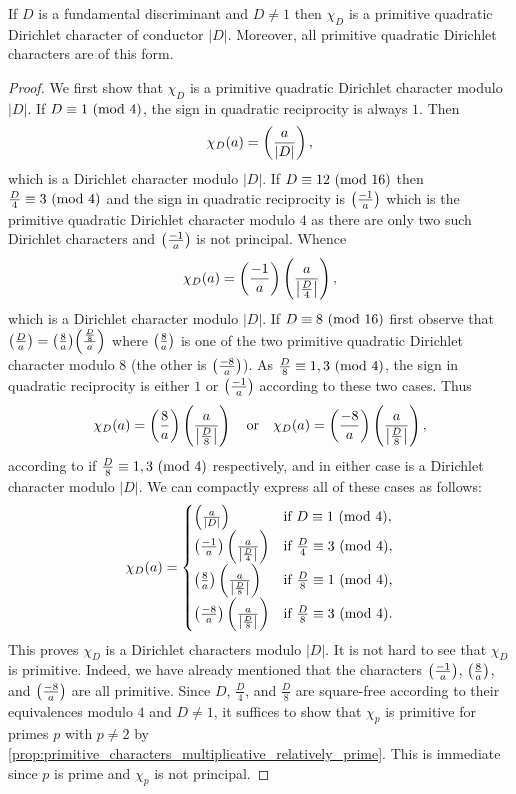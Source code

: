     \begin{theorem}\label{thm:fundamental_discriminant_character_primitive}
      If \(D\) is a fundamental discriminant and \(D \neq 1\) then \(\chi_{D}\) is a primitive quadratic Dirichlet character of conductor \(|D|\). Moreover, all primitive quadratic Dirichlet characters are of this form.
    \end{theorem}
    \begin{proof}
      We first show that \(\chi_{D}\) is a primitive quadratic Dirichlet character modulo \(|D|\). If \(D \equiv 1 \ (\mathrm{mod}\text{ }4)\), the sign in quadratic reciprocity is always \(1\). Then
      \[
        \chi_{D}(a) = \left(\frac{a}{|D|}\right),
      \]
      which is a Dirichlet character modulo \(|D|\). If \(D \equiv 12 \ (\mathrm{mod}\text{ }16)\) then \(\frac{D}{4} \equiv 3 \ (\mathrm{mod}\text{ }4)\) and the sign in quadratic reciprocity is \(\textstyle{\left(\frac{-1}{a}\right)}\) which is the primitive quadratic Dirichlet character modulo \(4\) as there are only two such Dirichlet characters and \(\left(\frac{-1}{a}\right)\) is not principal. Whence
      \[
        \chi_{D}(a) = \left(\frac{-1}{a}\right)\left(\frac{a}{\left|\frac{D}{4}\right|}\right),
      \]
      which is a Dirichlet character modulo \(|D|\). If \(D \equiv 8 \ (\mathrm{mod}\text{ }16)\) first observe that \(\textstyle{\left(\frac{D}{a}\right)} = \textstyle{\left(\frac{8}{a}\right)}\textstyle{\left(\frac{\frac{D}{8}}{a}\right)}\) where \(\textstyle{\left(\frac{8}{a}\right)}\) is one of the two primitive quadratic Dirichlet character modulo \(8\) (the other is \(\textstyle{\left(\frac{-8}{a}\right)}\)). As \(\frac{D}{8} \equiv 1,3 \ (\mathrm{mod}\text{ }4)\), the sign in quadratic reciprocity is either \(1\) or \(\textstyle{\left(\frac{-1}{a}\right)}\) according to these two cases. Thus
      \[
        \chi_{D}(a) = \left(\frac{8}{a}\right)\left(\frac{a}{\left|\frac{D}{8}\right|}\right) \quad \text{or} \quad \chi_{D}(a) = \left(\frac{-8}{a}\right)\left(\frac{a}{\left|\frac{D}{8}\right|}\right),
      \]
      according to if \(\frac{D}{8} \equiv 1,3 \ (\mathrm{mod}\text{ }4)\) respectively, and in either case is a Dirichlet character modulo \(|D|\). We can compactly express all of these cases as follows:
      \[
        \chi_{D}(a) = \begin{cases} \left(\frac{a}{|D|}\right) & \text{if \(D \equiv 1 \ (\mathrm{mod}\text{ }4)\)}, \\ \left(\frac{-1}{a}\right)\left(\frac{a}{\left|\frac{D}{4}\right|}\right) & \text{if \(\frac{D}{4} \equiv 3 \ (\mathrm{mod}\text{ }4)\)}, \\ \left(\frac{8}{a}\right)\left(\frac{a}{\left|\frac{D}{8}\right|}\right) & \text{if \(\frac{D}{8} \equiv 1 \ (\mathrm{mod}\text{ }4)\)}, \\ \left(\frac{-8}{a}\right)\left(\frac{a}{\left|\frac{D}{8}\right|}\right) & \text{if \(\frac{D}{8} \equiv 3 \ (\mathrm{mod}\text{ }4)\)}. \end{cases}
      \]
      This proves \(\chi_{D}\) is a Dirichlet characters modulo \(|D|\). It is not hard to see that \(\chi_{D}\) is primitive. Indeed, we have already mentioned that the characters \(\textstyle{\left(\frac{-1}{a}\right)}\), \(\textstyle{\left(\frac{8}{a}\right)}\), and \(\textstyle{\left(\frac{-8}{a}\right)}\) are all primitive. Since \(D\), \(\frac{D}{4}\), and \(\frac{D}{8}\) are square-free according to their equivalences modulo \(4\) and \(D \neq 1\), it suffices to show that \(\chi_{p}\) is primitive for primes \(p\) with \(p \neq 2\) by \cref{prop:primitive_characters_multiplicative_relatively_prime}. This is immediate since \(p\) is prime and \(\chi_{p}\) is not principal. 
      

\end{proof}
